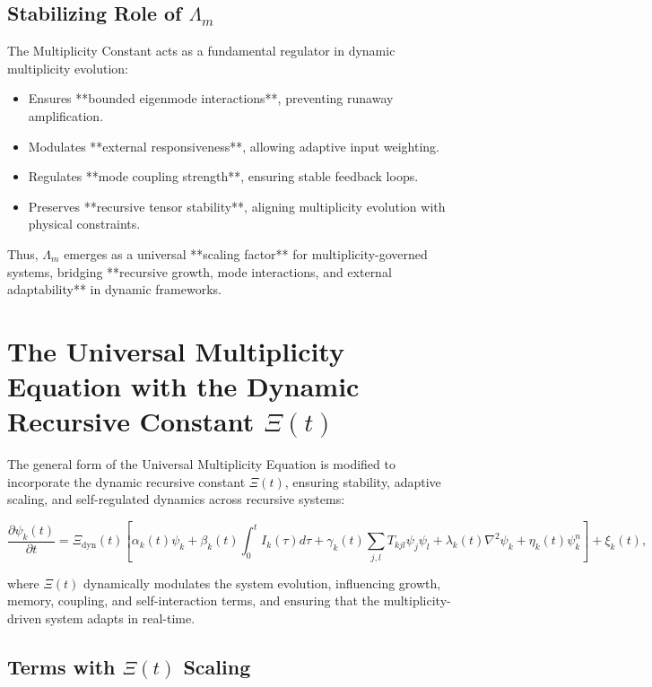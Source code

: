 \documentclass{article}
\theoremstyle{plain}
\begin{document}
\subsection{Stabilizing Role of \( \Lambda_m \)}

The Multiplicity Constant acts as a fundamental regulator in dynamic multiplicity evolution:

\begin{itemize}
    \item Ensures **bounded eigenmode interactions**, preventing runaway amplification.
    \item Modulates **external responsiveness**, allowing adaptive input weighting.
    \item Regulates **mode coupling strength**, ensuring stable feedback loops.
    \item Preserves **recursive tensor stability**, aligning multiplicity evolution with physical constraints.
\end{itemize}

Thus, \( \Lambda_m \) emerges as a universal **scaling factor** for multiplicity-governed systems, bridging **recursive growth, mode interactions, and external adaptability** in dynamic frameworks.


\section{The Universal Multiplicity Equation with the Dynamic Recursive Constant \(\Xi(t) \)}

The general form of the Universal Multiplicity Equation is modified to incorporate the dynamic recursive constant \(\Xi(t) \), ensuring stability, adaptive scaling, and self-regulated dynamics across recursive systems:

\begin{equation}
\frac{\partial \psi_k(t)}{\partial t} = \Xi_{\text{dyn}}(t) \left[ \alpha_k(t) \psi_k + \beta_k(t) \int_0^t I_k(\tau) d\tau + \gamma_k(t) \sum_{j,l} T_{kjl} \psi_j \psi_l + \lambda_k(t) \nabla^2 \psi_k + \eta_k(t) \psi_k^n \right] + \xi_k(t),
\end{equation}

where \(\Xi(t) \) dynamically modulates the system evolution, influencing growth, memory, coupling, and self-interaction terms, and ensuring that the multiplicity-driven system adapts in real-time.

\subsection{Terms with \(\Xi(t) \) Scaling}
\end{document}
